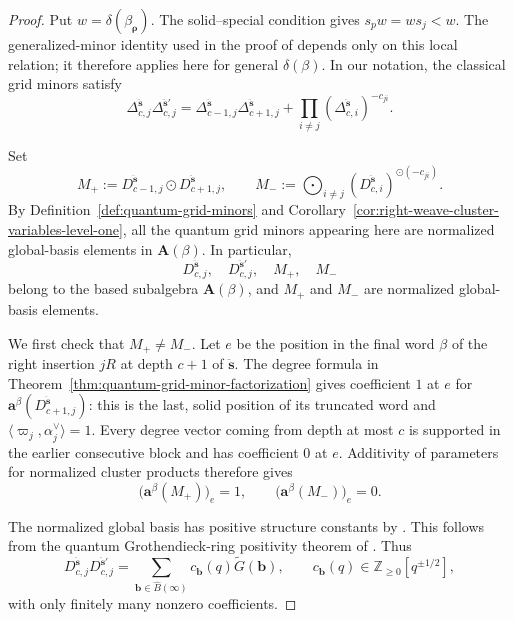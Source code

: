 \documentclass[12pt, reqno]{amsart}
\theoremstyle{plain}
\theoremstyle{definition}
\numberwithin{equation}{section}
\newcommand{\ZZ}{\mathbb{Z}}
\newcommand{\bb}{\mathbf{b}}
\begin{document}
\begin{proof}
Put \(w=\delta(\beta_{\boldsymbol\rho})\). The solid--special
condition gives \(s_pw=ws_j<w\). The generalized-minor identity
used in the proof of \cite[Proposition~4.6]{galashin2026braidII}
depends only on this local relation; it therefore applies here
for general \(\delta(\beta)\). In our notation, the classical grid
minors satisfy
\begin{equation}
\label{eq:classical-grid-minor-T-system}
    \Delta_{c,j}^{\ddot{\mathbf s}}
    \Delta_{c,j}^{\ddot{\mathbf s}'}
    =
    \Delta_{c-1,j}^{\ddot{\mathbf s}}
    \Delta_{c+1,j}^{\ddot{\mathbf s}}
    +
    \prod_{i\neq j}
    \left(
        \Delta_{c,i}^{\ddot{\mathbf s}}
    \right)^{-c_{ji}}.
\end{equation}

Set
\[
    M_+
    :=
    D_{c-1,j}^{\ddot{\mathbf s}}
    \odot
    D_{c+1,j}^{\ddot{\mathbf s}},
    \qquad
    M_-
    :=
    \bigodot_{i\neq j}
    \left(
        D_{c,i}^{\ddot{\mathbf s}}
    \right)^{\odot(-c_{ji})}.
\]
By Definition~\ref{def:quantum-grid-minors} and Corollary~\ref{cor:right-weave-cluster-variables-level-one}, all the
quantum grid minors appearing here are normalized global-basis elements in \(\mathbf A(\beta)\).
In particular,
\[
    D_{c,j}^{\ddot{\mathbf s}},
    \quad
    D_{c,j}^{\ddot{\mathbf s}'},
    \quad
    M_+,
    \quad
    M_-
\]
belong to the based subalgebra \(\mathbf A(\beta)\), and \(M_+\) and
\(M_-\) are normalized global-basis elements.

We first check that \(M_+\neq M_-\). Let \(e\) be the position
in the final word \(\beta\) of the right insertion \(jR\) at
depth \(c+1\) of \(\ddot{\mathbf s}\). The degree formula in
Theorem~\ref{thm:quantum-grid-minor-factorization} gives coefficient
\(1\) at \(e\) for
\(\mathbf a^\beta(D_{c+1,j}^{\ddot{\mathbf s}})\): this is the
last, solid position of its truncated word and
\(\langle\varpi_j,\alpha_j^\vee\rangle=1\).
Every degree vector coming from depth at most \(c\) is supported
in the earlier consecutive block and has coefficient \(0\) at
\(e\). Additivity of parameters for normalized cluster products
therefore gives
\begin{equation}\label{eq:T-system-distinct-terms}
    \bigl(\mathbf a^\beta(M_+)\bigr)_e=1,
    \qquad
    \bigl(\mathbf a^\beta(M_-)\bigr)_e=0.
\end{equation}

The normalized global basis has positive structure constants by
\cite[Corollary~6.6]{kashiwara2025monoidal}.
This follows from the quantum Grothendieck-ring positivity theorem
of \cite[Theorem~4.3]{varagnolo2003perverse}. Thus
\begin{equation}\label{eq:T-system-global-basis-expansion}
    D_{c,j}^{\ddot{\mathbf s}}
    D_{c,j}^{\ddot{\mathbf s}'}
    =
    \sum_{\bb\in\widehat B(\infty)}
        c_{\bb}(q)\widetilde G(\bb),
    \qquad
    c_{\bb}(q)\in
    \ZZ_{\geq0}[q^{\pm1/2}],
\end{equation}
with only finitely many nonzero coefficients.


\end{proof}
\end{document}
